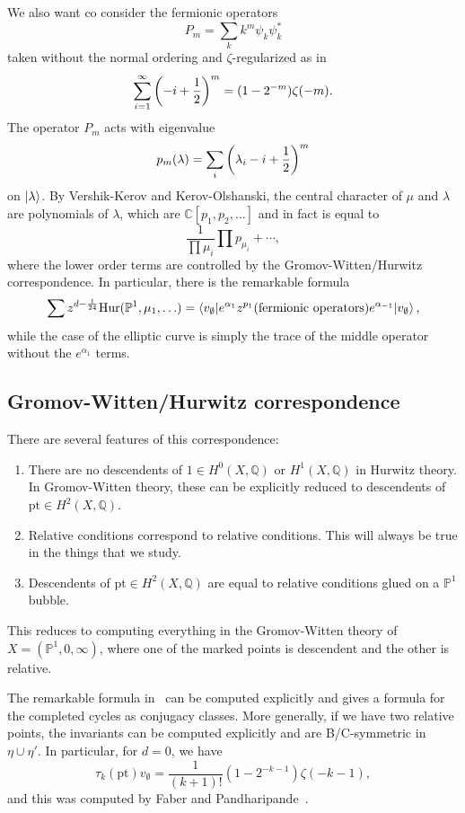 \documentclass[leqno, openany]{memoir}
\theoremstyle{definition}
\theoremstyle{remark}
\theoremstyle{plain}
\theoremstyle{definition}
\theoremstyle{remark}
\newcommand{\C}{\mathbb{C}}
\newcommand{\Q}{\mathbb{Q}}
\renewcommand{\P}{\mathbb{P}}
\newcommand{\mr}[1]{\mathrm{#1}}
\begin{document}
We also want co consider the fermionic operators
\[ P_m = \sum_k k^m \psi_k \psi_k^* \]
taken without the normal ordering and $\zeta$-regularized as in
\[ \sum_{i=1}^{\infty} \qty(-i + \frac{1}{2})^m = (1-2^{-m})\zeta(-m). \]
The operator $P_m$ acts with eigenvalue
\[ p_m(\lambda) = \sum_i \qty(\lambda_i - i + \frac{1}{2})^m \]
on $\ket{\lambda}$. By Vershik-Kerov and Kerov-Olshanski, the central character of $\mu$ and $\lambda$ are polynomials of $\lambda$, which are $\C[p_1, p_2, \ldots]$ and in fact is equal to
\[ \frac{1}{\prod \mu_i} \prod p_{\mu_i} + \cdots, \]
where the lower order terms are controlled by the Gromov-Witten/Hurwitz correspondence. In particular, there is the remarkable formula
\[ \sum z^{d-\frac{1}{24}} \mr{Hur}(\P^1, \mu_1, \ldots) = \mel**{v_{\emptyset}}{e^{\alpha_1} z^{p_1} (\text{fermionic operators}) e^{\alpha_{-1}}}{v_{\emptyset}}, \]
while the case of the elliptic curve is simply the trace of the middle operator without the $e^{\alpha_1}$ terms.

\subsection{Gromov-Witten/Hurwitz correspondence}

There are several features of this correspondence:
\begin{enumerate}
    \item There are no descendents of $1 \in H^0(X, \Q)$ or $H^1(X, \Q)$ in Hurwitz theory. In Gromov-Witten theory, these can be explicitly reduced to descendents of $\mr{pt} \in H^2(X, \Q)$.
    \item Relative conditions correspond to relative conditions. This will always be true in the things that we study.
    \item Descendents of $\mr{pt} \in H^2(X, \Q)$ are equal to relative conditions glued on a $\P^1$ bubble.
\end{enumerate}
This reduces to computing everything in the Gromov-Witten theory of $X = (\P^1, 0, \infty)$, where one of the marked points is descendent and the other is relative.

The remarkable formula in~ can be computed explicitly and gives a formula for the completed cycles as conjugacy classes. More generally, if we have two relative points, the invariants can be computed explicitly and are B/C-symmetric in $\eta \cup \eta'$. In particular, for $d = 0$, we have
\[ \tau_k(\mr{pt}) v_{\emptyset} = \frac{1}{(k+1)!}(1-2^{-k-1}) \zeta(-k-1), \]
and this was computed by Faber and Pandharipande~\cite{gwhodge}.
\end{document}
